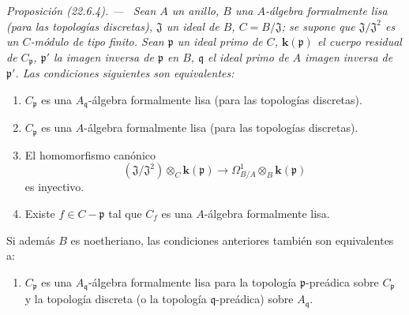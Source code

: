 \documentclass[10pt,oneside]{book}
\makeatletter
\newcommand{\setmanualcurrentlabel}[1]{\def\@currentlabel{#1}}
\newenvironment{proposition}[1][]{%
  \setmanualcurrentlabel{#1}\par\medskip\noindent\itshape Proposición (#1). ---\ }{\par}
\providecommand{\setmin}{-}%
\makeatother
\begin{document}
\begin{proposition}[22.6.4]
\label{0.22.6.4-es}
Sean $A$ un anillo, $B$ una $A$-álgebra formalmente lisa (para las
topologías discretas), $\mathfrak J$ un ideal de $B$, $C=B/\mathfrak J$; se
supone que $\mathfrak J/\mathfrak J^2$ es un $C$-módulo de tipo finito. Sean
$\mathfrak p$ un ideal primo de $C$, $\boldsymbol k(\mathfrak p)$ el cuerpo residual de
$C_{\mathfrak p}$, $\mathfrak p'$ la imagen inversa de $\mathfrak p$ en
$B$, $\mathfrak q$ el ideal primo de $A$ imagen inversa de $\mathfrak p'$.
Las condiciones siguientes son equivalentes:
\begin{enumerate}
  \item[\textup{a)}] $C_{\mathfrak p}$ es una $A_{\mathfrak q}$-álgebra formalmente
  lisa (para las topologías discretas).
  \item[\textup{a')}] $C_{\mathfrak p}$ es una $A$-álgebra formalmente lisa (para
  las topologías discretas).
  \item[\textup{b)}] El homomorfismo canónico
  \begin{equation}
  \label{0.22.6.4.1-es}
    (\mathfrak J/\mathfrak J^2)\otimes_C\boldsymbol k(\mathfrak p)
    \longrightarrow\Omega^1_{B/A}\otimes_B\boldsymbol k(\mathfrak p)
    \tag{22.6.4.1}
  \end{equation}
  es inyectivo.
  \item[\textup{c)}] Existe $f\in C\setmin\mathfrak p$ tal que $C_f$ es una
  $A$-álgebra formalmente lisa.
\end{enumerate}
Si además $B$ es noetheriano, las condiciones anteriores también son
equivalentes a:
\begin{enumerate}
  \item[\textup{d)}] $C_{\mathfrak p}$ es una $A_{\mathfrak q}$-álgebra formalmente
  lisa para la topología $\mathfrak p$-preádica sobre $C_{\mathfrak p}$ y la
  topología discreta (o la topología $\mathfrak q$-preádica) sobre
  $A_{\mathfrak q}$.
\end{enumerate}
\end{proposition}
\end{document}
